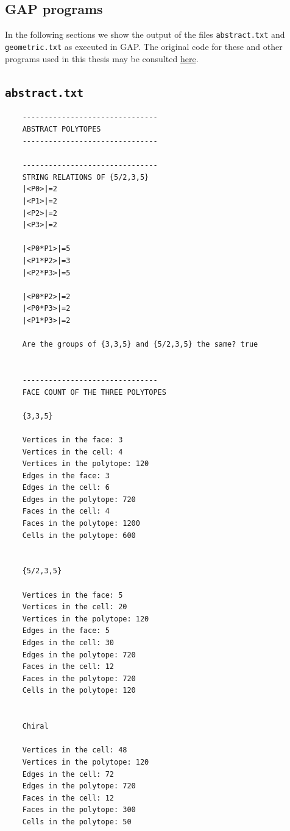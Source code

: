 \documentclass{article}
\theoremstyle{definition}
\begin{document}
\clearpage
\begin{appendices}
\section{GAP programs}
In the following sections we show the output of the files \texttt{abstract.txt} and \texttt{geometric.txt} as executed in GAP. The original code for these and other programs used in this thesis may be consulted \href{github.com/danimalabares/tesina}{here}.

\subsection{\texttt{abstract.txt}}\label{app:1}

\begin{changemargin}{-2cm}{-2cm}
\begin{multicols}{2}
\begin{lstlisting}
	-------------------------------
	ABSTRACT POLYTOPES
	-------------------------------
	
	-------------------------------
	STRING RELATIONS OF {5/2,3,5}
	|<P0>|=2
	|<P1>|=2
	|<P2>|=2
	|<P3>|=2
	
	|<P0*P1>|=5
	|<P1*P2>|=3
	|<P2*P3>|=5
	
	|<P0*P2>|=2
	|<P0*P3>|=2
	|<P1*P3>|=2
	
	Are the groups of {3,3,5} and {5/2,3,5} the same? true
	
	
	-------------------------------
	FACE COUNT OF THE THREE POLYTOPES
	
	{3,3,5}
	
	Vertices in the face: 3
	Vertices in the cell: 4
	Vertices in the polytope: 120
	Edges in the face: 3
	Edges in the cell: 6
	Edges in the polytope: 720
	Faces in the cell: 4
	Faces in the polytope: 1200
	Cells in the polytope: 600
	
	
	{5/2,3,5}
	
	Vertices in the face: 5
	Vertices in the cell: 20
	Vertices in the polytope: 120
	Edges in the face: 5
	Edges in the cell: 30
	Edges in the polytope: 720
	Faces in the cell: 12
	Faces in the polytope: 720
	Cells in the polytope: 120
	
	
	Chiral
	
	Vertices in the cell: 48
	Vertices in the polytope: 120
	Edges in the cell: 72
	Edges in the polytope: 720
	Faces in the cell: 12
	Faces in the polytope: 300
	Cells in the polytope: 50
	

\end{lstlisting}
\end{multicols}
\end{changemargin}
\end{appendices}
\end{document}
